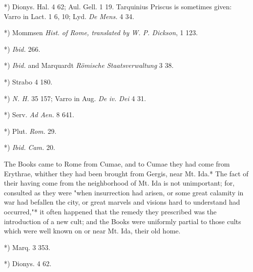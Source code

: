 \documentclass[a4paper, 11pt, oneside, polutonikogreek, english]{article}
\begin{document}
*) Dionys. Hal. 4 62; Aul. Gell. 1 19. Tarquinius Priscus is sometimes given: Varro in Lact. 1 6, 10; Lyd. \emph{De Mens.} 4 34.

*) Mommsen \emph{Hist. of Rome, translated by W. P. Dickson}, 1 123.

*) \emph{Ibid.} 266.

*) \emph{Ibid.} and Marquardt \emph{Römische Staatsverwaltung} 3 38.

*) Strabo 4 180.

*) \emph{N. H.} 35 157; Varro in Aug. \emph{De iv. Dei} 4 31.

*) Serv. \emph{Ad Aen.} 8 641.

*) Plut. \emph{Rom.} 29.

*) \emph{Ibid.} \emph{Cam.} 20.

The Books came to Rome from Cumae, and to Cumae they had come from Erythrae, whither they had been brought from Gergis, near Mt. Ida.* The fact of their having come from the neighborhood of Mt. Ida is not unimportant; for, consulted as they were "when insurrection had arisen, or some great calamity in war had befallen the city, or great marvels and visions hard to understand had occurred,"* it often happened that the remedy they prescribed was the introduction of a new cult; and the Books were uniformly partial to those cults which were well known on or near Mt. Ida, their old home.

*) Marq. 3 353.

*) Dionys. 4 62.
\end{document}
